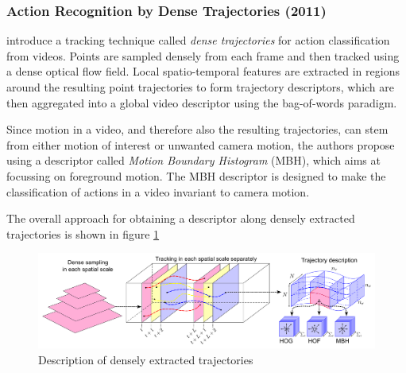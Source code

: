 \subsubsection{Action Recognition by Dense Trajectories (2011)}
\textcite{wang_action_2011} introduce a tracking technique called \textit{dense trajectories} for action classification from videos.
Points are sampled densely from each frame and then tracked using a dense optical flow field.
Local spatio-temporal features are extracted in regions around the resulting point trajectories to form trajectory descriptors, which are then aggregated into a global video descriptor using the bag-of-words paradigm.

%

Since motion in a video, and therefore also the resulting trajectories, can stem from either motion of interest or unwanted camera motion, the authors propose using a descriptor called \textit{Motion Boundary Histogram} (MBH), which aims at focussing on foreground motion.
The MBH descriptor is designed to make the classification of actions in a video invariant to camera motion.

The overall approach for obtaining a descriptor along densely extracted trajectories is shown in figure \ref{fig:densetrajectories_approach}

\begin{figure}[H]
    \centering
    \includegraphics[width=\textwidth]{img_conventional/densetrajectories_approach}
    \caption{Description of densely extracted trajectories \cite{wang_action_2011}}
    \label{fig:densetrajectories_approach}
\end{figure}

